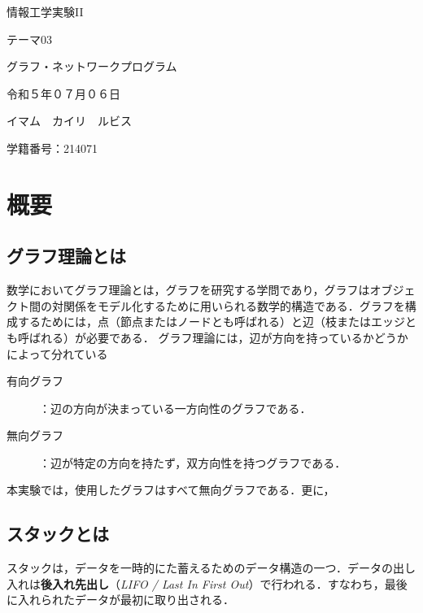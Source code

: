 \documentclass[a4j, titlepage]{jarticle}
\begin{document}
  \begin{center}
  \huge 情報工学実験II\par
  \vspace{15mm}
  \huge テーマ03 \par
  \huge グラフ・ネットワークプログラム \par
  \vspace{15mm}
  \vspace{20mm}
  \vspace{100mm}
  \Large 令和５年０７月０６日 \par
  \vspace{15mm}
  \Large イマム　カイリ　ルビス \par
  \vspace{10mm}
  \Large 学籍番号：214071\par
  \vspace{10mm}
\end{center}
\clearpage

\tableofcontents
\clearpage

\section{概要}
    \subsection{グラフ理論とは}
    数学においてグラフ理論とは，グラフを研究する学問であり，グラフはオブジェクト間の対関係をモデル化するために用いられる数学的構造である．グラフを構成するためには，点（節点またはノードとも呼ばれる）と辺（枝またはエッジとも呼ばれる）が必要である\cite{bib:wikigraph}． 
    グラフ理論には，辺が方向を持っているかどうかによって分れている
    \begin{description}
        \item[有向グラフ]：辺の方向が決まっている一方向性のグラフである．
        \item[無向グラフ]：辺が特定の方向を持たず，双方向性を持つグラフである．
    \end{description}
    本実験では，使用したグラフはすべて無向グラフである．更に，

    \subsection{スタックとは} 
    スタックは，データを一時的にた蓄えるためのデータ構造の一つ．データの出し入れは\textbf{後入れ先出し}（\textit{LIFO / Last In First Out}）で行われる．すなわち，最後に入れられたデータが最初に取り出される\cite{bib:boyoh}．
\end{document}
